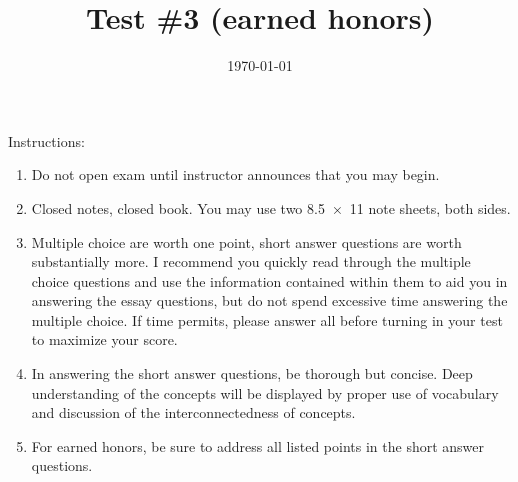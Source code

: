 \documentclass[exam,addpoints,noanswers]{exam}
\title{Test \#3 (earned honors)}
\date{\today}
\author{\mobeardInstructorShort}
\begin{document}
\maketitle
\vfill
\mobeardExamNameBlock
\vfill
Instructions: 
\begin{enumerate}
\item Do not open exam until instructor announces that you may begin.
\item Closed notes, closed book.  You may use two \SI{8.5x11}{\inch} note sheets, both sides.
\item Multiple choice are worth one point, short answer questions are worth substantially more. I recommend you quickly read through the multiple choice questions and use the information contained within them to aid you in answering the essay questions, but do not spend excessive time answering the multiple choice. If time permits, please answer all before turning in your test to maximize your score.
\item In answering the short answer questions, be thorough but concise. Deep understanding of the concepts will be displayed by proper use of vocabulary and discussion of the interconnectedness of concepts.
\item For earned honors, be sure to address all listed points in the short answer questions.
\end{enumerate}
\vfill
\begin{center}
\gradetable[h][questions]
\end{center}
\clearpage
\end{document}
